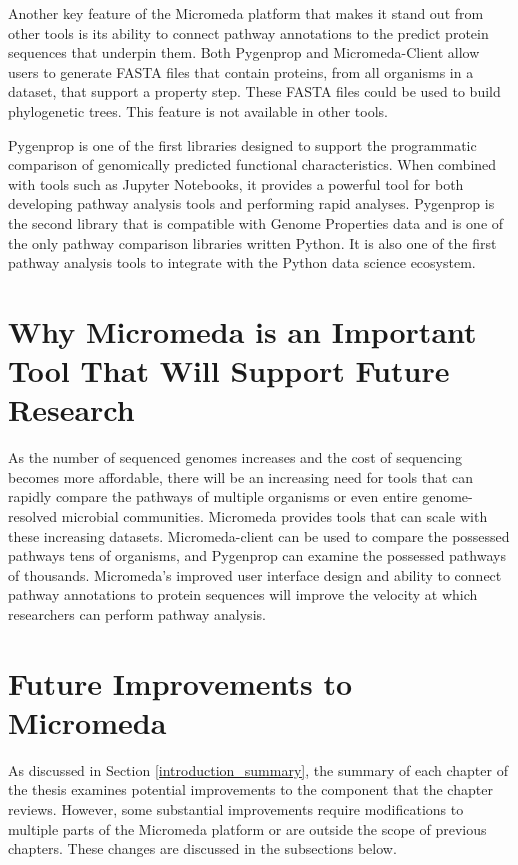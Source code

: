 Another key feature of the Micromeda platform that makes it stand out from other tools is its ability to connect pathway annotations to the predict protein sequences that underpin them. Both Pygenprop and Micromeda-Client allow users to generate FASTA files that contain proteins, from all organisms in a dataset, that support a property step. These FASTA files could be used to build phylogenetic trees. This feature is not available in other tools.

Pygenprop is one of the first libraries designed to support the programmatic comparison of genomically predicted functional characteristics. When combined with tools such as Jupyter Notebooks, it provides a powerful tool for both developing pathway analysis tools and performing rapid analyses. Pygenprop is the second library that is compatible with Genome Properties data and is one of the only pathway comparison libraries written Python. It is also one of the first pathway analysis tools to integrate with the Python data science ecosystem.

\section{Why Micromeda is an Important Tool That Will Support Future Research}

As the number of sequenced genomes increases and the cost of sequencing becomes more affordable, there will be an increasing need for tools that can rapidly compare the pathways of multiple organisms or even entire genome-resolved microbial communities. Micromeda provides tools that can scale with these increasing datasets. Micromeda-client can be used to compare the possessed pathways tens of organisms, and Pygenprop can examine the possessed pathways of thousands. Micromeda's improved user interface design and ability to connect pathway annotations to protein sequences will improve the velocity at which researchers can perform pathway analysis.

\section{Future Improvements to Micromeda}

As discussed in Section \ref{introduction_summary}, the summary of each chapter of the thesis examines potential improvements to the component that the chapter reviews. However, some substantial improvements require modifications to multiple parts of the Micromeda platform or are outside the scope of previous chapters. These changes are discussed in the subsections below.

